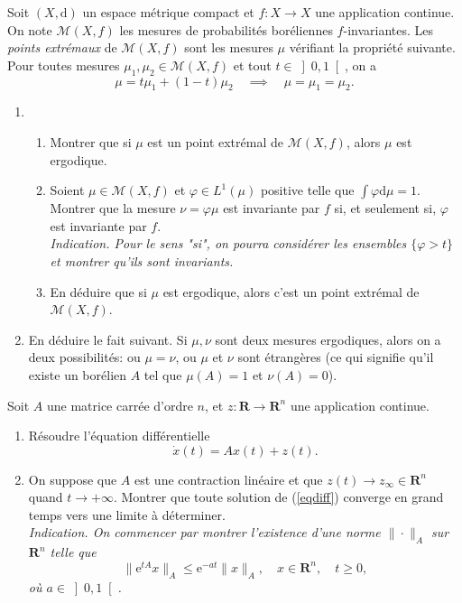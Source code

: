 \documentclass[a4paper,10pt,openany]{article}
\theoremstyle{plain}
\theoremstyle{definition}
\newcommand{\e}{\mathrm{e}}
\newcommand{\dd}{\mathrm{d}}
\newcommand{\R}{\mathbf{R}}
\begin{document}
\noindent Soit $(X, \dd)$ un espace m\'etrique compact et $f : X \to X$ une application continue. On note $\mathcal M(X,f)$  les mesures de probabilit\'es bor\'eliennes $f$-invariantes. Les \textit{points extr\'emaux} de $\mathcal{M}(X,f)$ sont les mesures $\mu$ v\'erifiant la propri\'et\'e suivante. Pour toutes mesures $\mu_1, \mu_2 \in \mathcal{M}(X,f)$ et tout $t \in \left]0, 1\right[$, on a
$$
 \mu = t\mu_1 + (1-t) \mu_2 \quad \implies \quad \mu = \mu_1 = \mu_2.
$$
\begin{enumerate}
\item
\begin{enumerate}
\item Montrer que si $\mu$ est un point extr\'emal de $\mathcal M(X,f)$, alors $\mu$ est ergodique.
\item Soient $\mu \in \mathcal{M}(X,f)$ et $\varphi \in L^1(\mu)$ positive telle que $\int \varphi \dd \mu = 1$. Montrer que la mesure $\nu = \varphi \mu$ est invariante par $f$ si, et seulement si, $\varphi$ est invariante par $f$. \\
\textit{Indication. Pour le sens "si", on pourra consid\'erer les ensembles $\{\varphi > t\}$ et montrer qu'ils sont invariants.}
\item En d\'eduire que si $\mu$ est ergodique, alors c'est un point extr\'emal de $\mathcal{M}(X,f)$.
\end{enumerate}
\item En d\'eduire le fait suivant. Si $\mu, \nu$ sont deux mesures ergodiques, alors on a deux possibilit\'es: ou $\mu = \nu$, ou $\mu$ et $\nu$ sont \'etrang\`eres (ce qui signifie qu'il existe un bor\'elien $A$ tel que $\mu(A) = 1$ et $\nu(A) = 0$).
\end{enumerate}

\vspace{0.6cm}


 \vspace{1.5mm} 

\noindent Soit $A$ une matrice carr\'ee d'ordre $n$, et $z : \R \to \R^n$ une application continue. 

\begin{enumerate}
\item R\'esoudre l'\'equation diff\'erentielle 
\begin{equation}\label{eqdiff}
\dot{x}(t) = A x(t) + z(t).
\end{equation}
\item On suppose que $A$ est une contraction lin\'eaire et que $z(t) \to z_\infty \in \R^n$ quand $t \to +\infty$. Montrer que toute solution de (\ref{eqdiff}) converge en grand temps vers une limite \`a d\'eterminer.\\
\textit{Indication. On commencer par montrer l'existence d'une norme $\| \cdot\|_A$ sur $\R^n$ telle que $$ \|\e^{tA} x\|_A \leqslant \e^{-at} \|x\|_A, \quad x \in \R^n, \quad t \geqslant 0,$$ o\`u $a \in \left]0, 1\right[$.}
\end{enumerate}
\end{document}
